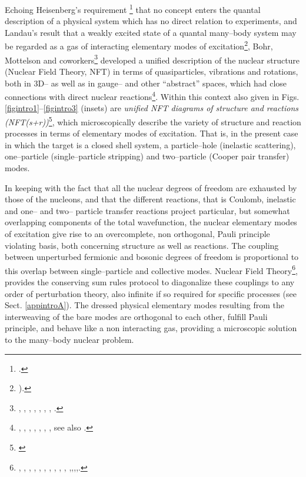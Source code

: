 Echoing Heisenberg's requirement \footnote{\cite{Heisenberg:49}.} that no concept enters the quantal description of a physical system which has no direct relation to experiments, and Landau's result that a weakly excited state of a quantal many--body system may be regarded as a gas of  interacting elementary modes of excitation\footnote{\cite{Landau:41}).}, Bohr, Mottelson and coworkers\footnote{\cite{Bohr:69}, \cite{Bohr:76}, \cite{Mottelson:76}, \cite{Bohr:75}, \cite{Bohr:58}, \cite{Belyaev:59}, \cite{Nilsson:55},  \cite{Bes:66}.} developed a unified description of the nuclear  structure (Nuclear Field Theory, NFT) in terms of quasiparticles, vibrations and rotations, both in 3D-- as well as in gauge-- and other ``abstract'' spaces, which had  close connections with direct nuclear reactions\footnote{ \cite{Alder:56}, \cite{Alder:75}, \cite{Broglia:04a}, \cite{Austern:70}, \cite{Glendenning:04}, \cite{Satchler:80}, \cite{Satchler:83}, see also \cite{Potel:13}.}. Within this context also given in Figs. \ref{figintro1}--\ref{figintro3} (insets) are \textit{unified NFT diagrams of structure and reactions (NFT(s+r))}\footnote{ \cite{Broglia:75,Broglia:04a,Potel:13,Broglia:16}}, which microscopically describe the variety of structure and reaction processes in terms of elementary modes of excitation. That is, in the present case in which the target is a closed shell system, a particle--hole (inelastic scattering), one--particle (single--particle stripping) and two--particle (Cooper pair transfer) modes.

In keeping with the fact that all the nuclear degrees of freedom are exhausted by those of the nucleons, and that the different reactions, that is Coulomb, inelastic and one-- and two-- particle transfer reactions project particular, but somewhat
 overlapping  components of the total wavefunction, the nuclear elementary modes of excitation give  rise to an overcomplete, non orthogonal, Pauli principle violating basis, both concerning structure as well as reactions. The coupling between unperturbed fermionic and bosonic degrees of freedom is proportional to this overlap between single--particle and collective modes. Nuclear Field Theory\footnote{\cite{Bes:76a}, \cite{Bes:76b}, \cite{Bes:76c}, \cite{Bes:75}, \cite{Broglia:76}, \cite{Bes:75b}, \cite{Mottelson:76}, \cite{Bes:77}, \cite{Bortignon:77}, \cite{Bortignon:78}, \cite{Broglia:04a},\cite{Reinhardt:75},\cite{Reinhardt:78a},\cite{Reinhardt:78b},\cite{Reinhardt:80}.}, provides the conserving sum rules protocol to diagonalize these couplings  to any order of perturbation theory, also infinite if so required for specific processes (see Sect. \ref{appintroA}). The dressed physical elementary modes resulting from the interweaving of the bare modes are orthogonal to each other, fulfill Pauli principle, and behave like a non interacting gas, providing a microscopic solution to the many--body nuclear problem. 
 
